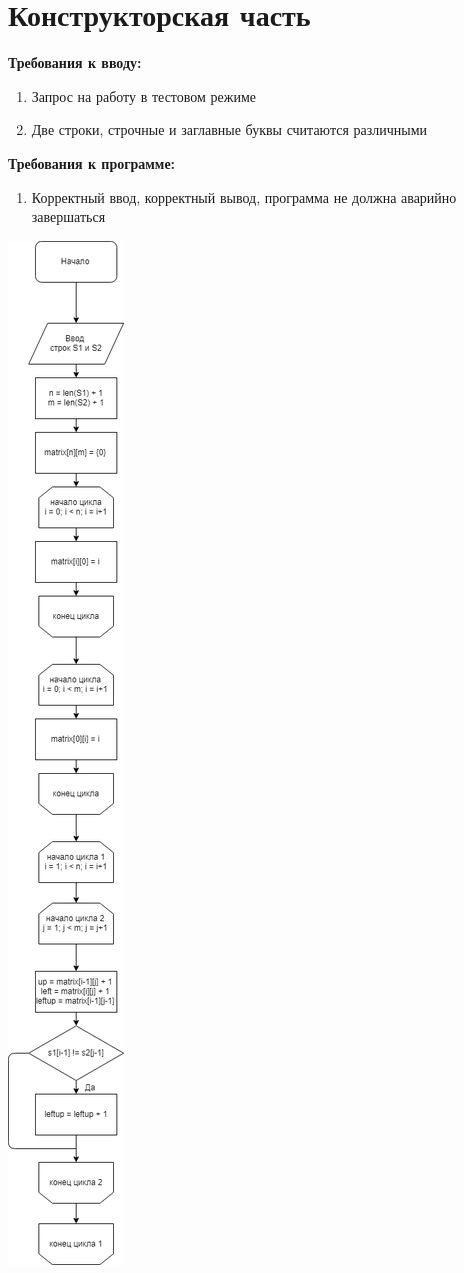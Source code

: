 \documentclass[12pt]{report}
\begin{document}
\chapter{Конструкторская часть}
\textbf{Требования к вводу:}
\begin{enumerate}
	\item Запрос на работу в тестовом режиме
  	\item Две строки, строчные и заглавные буквы считаются различными
\end{enumerate}
\textbf{Требования к программе:}
\begin{enumerate}
  	\item Корректный ввод, корректный вывод, программа не должна аварийно завершаться
\end{enumerate}

\begin{center}
    \includegraphics[scale=0.25]{lev_mtr}


\end{center}
\end{document}
